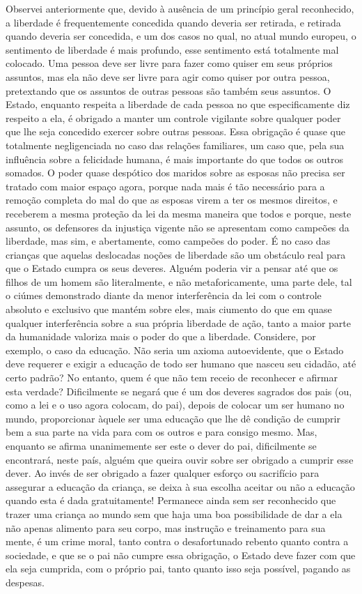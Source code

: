 Observei anteriormente que, devido à ausência de um princípio geral
reconhecido, a liberdade é frequentemente concedida quando deveria ser
retirada, e retirada quando deveria ser concedida, e um dos casos no
qual, no atual mundo europeu, o sentimento de liberdade é mais
profundo, esse sentimento está totalmente mal colocado. Uma pessoa deve
ser livre para fazer como quiser em seus próprios assuntos, mas ela não
deve ser livre para agir como quiser por outra pessoa,
pretextando que os assuntos de outras pessoas são também seus assuntos.
O Estado, enquanto respeita a liberdade de cada pessoa no que
especificamente diz respeito a ela, é obrigado a manter um controle
vigilante sobre qualquer poder que
lhe seja concedido exercer sobre outras pessoas. Essa obrigação é quase
que totalmente negligenciada no caso das relações familiares, um caso
que, pela sua influência sobre a felicidade humana, é mais importante
do que todos os outros somados. O poder quase despótico dos maridos
sobre as esposas não precisa ser tratado com maior espaço agora, porque
nada mais é tão necessário para a remoção completa do mal do que as
esposas virem a ter os mesmos direitos, e receberem a mesma proteção da
lei da mesma maneira que todos e porque, neste assunto, os
defensores da injustiça vigente não se apresentam como campeões da
liberdade, mas sim, e abertamente, como campeões do poder. É no caso
das crianças que aquelas deslocadas noções de liberdade são um
obstáculo real para que o Estado cumpra os seus deveres. Alguém poderia
vir a pensar até que os filhos de um homem são literalmente, e não
metaforicamente, uma parte dele, tal o ciúmes demonstrado diante
da menor interferência da lei com o controle absoluto e exclusivo que
mantém sobre eles, mais ciumento do que em quase qualquer
interferência sobre a sua própria liberdade de ação, tanto a maior parte da
humanidade valoriza mais o poder do que a liberdade. Considere, por
exemplo, o caso da educação. Não seria um axioma autoevidente, que o
Estado deve requerer e exigir a educação de todo ser humano que nasceu
seu cidadão, até certo padrão? No entanto, quem é que não tem receio de
reconhecer e afirmar esta verdade? Dificilmente se negará que é um dos
deveres sagrados dos pais (ou, como a lei e o uso agora colocam, do 
pai), depois de colocar um ser humano no mundo, proporcionar
àquele ser uma educação que lhe dê condição de cumprir bem a sua parte
na vida para com os outros e para consigo mesmo. Mas, enquanto se
afirma unanimemente ser este o dever do pai, dificilmente se encontrará,
neste país, \mbox{alguém} que queira ouvir sobre ser obrigado a cumprir esse
dever. Ao invés de ser obrigado a fazer qualquer esforço ou sacrifício
para assegurar a educação da criança, se deixa à sua escolha aceitar ou
não a educação quando esta é dada gratuitamente! Permanece ainda sem
ser reconhecido que trazer uma criança ao mundo sem que haja uma boa
possibilidade de dar a ela não apenas alimento para seu corpo, mas
instrução e treinamento para sua mente, é um crime moral, tanto contra
o desafortunado rebento quanto contra a sociedade, e que se o pai não
cumpre essa obrigação, o Estado deve fazer com que ela seja cumprida,
com o próprio pai, tanto quanto isso seja possível, pagando as despesas. 

